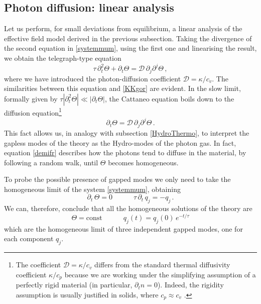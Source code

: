 \documentclass[a4paper, amsfonts, amssymb, amsmath, reprint, twocolumn, showkeys, nofootinbib]{revtex4-2}
\begin{document}
\subsection{Photon diffusion: linear analysis}

Let us perform, for small deviations from equilibrium, a linear analysis of the effective field model derived in the previous subsection. Taking the divergence of the second equation in \eqref{systemmum}, using the first one and linearising the result, we obtain the telegraph-type equation \cite{rezzolla_book}
\begin{equation}\label{rtkmovklll}
\tau \,  \partial_t^2  \Theta + \partial_t \Theta = \mathcal{D} \,  \partial_j \partial^j \Theta \, ,
\end{equation} 
where we have introduced the photon-diffusion coefficient $\mathcal{D} = \kappa/c_v$. The similarities between this equation and \eqref{KKgor} are evident. 
In the slow limit, formally given by 
$ \tau |\partial_t^2 \Theta| \ll |\partial_t \Theta| $, 
the Cattaneo equation boils down to the diffusion equation\footnote{
The coefficient $\mathcal{D}=\kappa /c_v$ differs from the standard thermal diffusivity coefficient $\kappa/c_p$ \citep{landau6} because we are working under the simplifying assumption of a perfectly rigid material (in particular, $\partial_t n=0$). Indeed, the rigidity assumption is usually justified in solids, where $c_p \approx c_v $ \citep{landau5}.
}
\begin{equation}\label{demifr}
\partial_t \Theta = \mathcal{D} \,  \partial_j \partial^j \Theta \, .
\end{equation} 
This fact allows us,  in analogy with subsection \ref{HydroThermo}, to interpret the gapless modes of the theory as the Hydro-modes of the photon gas. In fact, equation \eqref{demifr} describes how the photons tend to diffuse in the material, by following a random walk, until $\Theta$ becomes homogeneous. 

To probe the possible presence of gapped modes we only need to take the homogeneous limit of the system \eqref{systemmum}, obtaining
\begin{equation}
\partial_t \,  \Theta = 0   \quad \quad \quad   \tau \,  \partial_t \,  q_j =- q_j  \, .
\end{equation}
We can, therefore, conclude that all the homogeneous solutions of the theory are
\begin{equation}\label{Igappedcrudeli}
\Theta = \text{const}   \quad \quad \quad  q_j(t)=q_j(0) \, e^{-t/\tau}       
\end{equation}
which are the homogeneous limit of three independent gapped modes, one for each component $q_j$.
\end{document}
